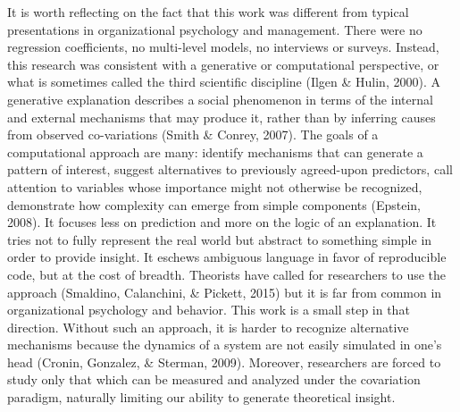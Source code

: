 \documentclass[english,,man]{apa6}
\begin{document}
It is worth reflecting on the fact that this work was different from typical presentations in organizational psychology and management. There were no regression coefficients, no multi-level models, no interviews or surveys. Instead, this research was consistent with a generative or computational perspective, or what is sometimes called the third scientific discipline (Ilgen \& Hulin, 2000). A generative explanation describes a social phenomenon in terms of the internal and external mechanisms that may produce it, rather than by inferring causes from observed co-variations (Smith \& Conrey, 2007). The goals of a computational approach are many: identify mechanisms that can generate a pattern of interest, suggest alternatives to previously agreed-upon predictors, call attention to variables whose importance might not otherwise be recognized, demonstrate how complexity can emerge from simple components (Epstein, 2008). It focuses less on prediction and more on the logic of an explanation. It tries not to fully represent the real world but abstract to something simple in order to provide insight. It eschews ambiguous language in favor of reproducible code, but at the cost of breadth. Theorists have called for researchers to use the approach (Smaldino, Calanchini, \& Pickett, 2015) but it is far from common in organizational psychology and behavior. This work is a small step in that direction. Without such an approach, it is harder to recognize alternative mechanisms because the dynamics of a system are not easily simulated in one's head (Cronin, Gonzalez, \& Sterman, 2009). Moreover, researchers are forced to study only that which can be measured and analyzed under the covariation paradigm, naturally limiting our ability to generate theoretical insight.
\end{document}
